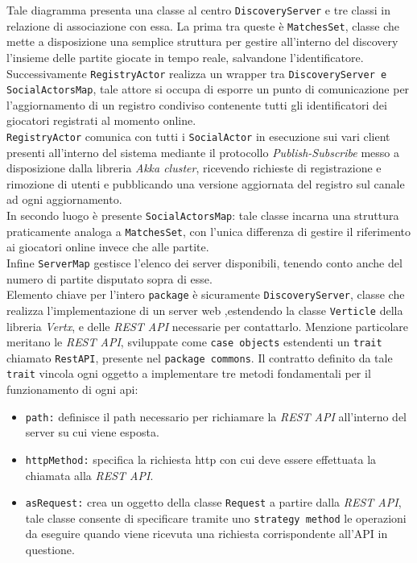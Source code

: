 Tale diagramma presenta una classe al centro \texttt{DiscoveryServer} e tre classi in relazione di associazione con essa.
La prima tra queste è \texttt{MatchesSet}, classe che mette a disposizione una semplice struttura per gestire all'interno del discovery l'insieme delle partite giocate in tempo reale, salvandone l'identificatore.\\
Successivamente \texttt{RegistryActor} realizza un wrapper tra \texttt{DiscoveryServer e SocialActorsMap}, tale attore si occupa di esporre un punto di comunicazione per l'aggiornamento di un registro condiviso contenente tutti gli identificatori dei giocatori registrati al momento online.\\ \texttt{RegistryActor} comunica con tutti i \texttt{SocialActor} in esecuzione sui vari client presenti all'interno del sistema mediante il protocollo \textit{Publish-Subscribe} messo a disposizione dalla libreria \textit{Akka cluster}, ricevendo richieste di registrazione e rimozione di utenti e pubblicando una versione aggiornata del registro sul canale ad ogni aggiornamento.\\
In secondo luogo è presente \texttt{SocialActorsMap}: tale classe incarna una struttura praticamente analoga a \texttt{MatchesSet}, con l'unica differenza di gestire il riferimento ai giocatori online invece che alle partite.\\
Infine \texttt{ServerMap} gestisce l'elenco dei server disponibili, tenendo conto anche del numero di partite disputato sopra di esse.\\
Elemento chiave per l'intero \texttt{package} è sicuramente \texttt{DiscoveryServer}, classe che realizza l'implementazione di un server web ,estendendo la classe \texttt{Verticle} della libreria \textit{Vertx}, e delle \textit{REST API} necessarie per contattarlo.
Menzione particolare meritano le \textit{REST API}, sviluppate come \texttt{case objects} estendenti un \texttt{trait} chiamato \texttt{RestAPI}, presente nel \texttt{package commons}. Il contratto definito da tale \texttt{trait} vincola ogni oggetto a implementare tre metodi fondamentali per il funzionamento di ogni api:
\begin{itemize}
  \item{\texttt{path:}} definisce il path necessario per richiamare la \textit{REST API} all'interno del server su cui viene esposta.

  \item{\texttt{httpMethod:}} specifica la richiesta http con cui deve essere effettuata la chiamata alla \textit{REST API}.

  \item{\texttt{asRequest:}} crea un oggetto della classe \texttt{Request} a partire dalla \textit{REST API}, tale classe consente di specificare tramite uno \texttt{strategy method} le operazioni da eseguire quando viene ricevuta una richiesta corrispondente all'API in questione.
\end{itemize}

